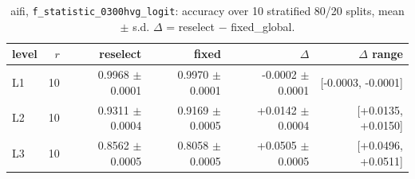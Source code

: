 \begin{table}[t]
\centering
\small
\begin{tabular}{lrrrrr}
\toprule
level & $r$ & reselect & fixed & $\Delta$ & $\Delta$ range \\
\midrule
L1 & 10 & 0.9968 $\pm$ 0.0001 & 0.9970 $\pm$ 0.0001 & -0.0002 $\pm$ 0.0001 & [-0.0003, -0.0001] \\
L2 & 10 & 0.9311 $\pm$ 0.0004 & 0.9169 $\pm$ 0.0005 & +0.0142 $\pm$ 0.0004 & [+0.0135, +0.0150] \\
L3 & 10 & 0.8562 $\pm$ 0.0005 & 0.8058 $\pm$ 0.0005 & +0.0505 $\pm$ 0.0005 & [+0.0496, +0.0511] \\
\bottomrule
\end{tabular}
\caption{aifi, \texttt{f\_statistic\_0300hvg\_logit}: accuracy over 10 stratified 80/20 splits, mean $\pm$ s.d. $\Delta$ = reselect $-$ fixed\_global.}
\label{tab:repeats-aifi-accuracy}
\end{table}
